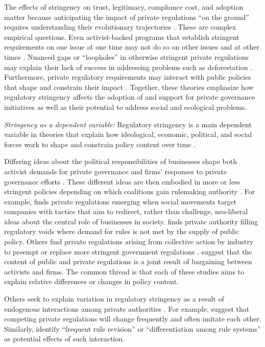 \documentclass[
      12pt,
            Review ]{article}
\begin{document}
The effects of stringency on trust, legitimacy, compliance cost, and adoption matter because anticipating the impact of private regulations ``on the ground'' requires understanding their evolutionary trajectories \citep{VanderVen2018}. These are complex empirical questions. Even activist-backed programs that establish stringent requirements on one issue at one time may not do so on other issues and at other times \citep{LeBaron2018}. Nuanced gaps or ``loopholes'' in otherwise stringent private regulations may explain their lack of success in addressing problems such as deforestation \citep{VanderVen2018}. Furthermore, private regulatory requirements may interact with public policies that shape and constrain their impact \citep{Bartley2018}. Together, these theories emphasize how regulatory stringency affects the adoption of and support for private governance initiatives as well as their potential to address social and ecological problems.

\emph{Stringency as a dependent variable:} Regulatory stringency is a main dependent variable in theories that explain how ideological, economic, political, and social forces work to shape and constrain policy content over time \citep{Bartley2003, Cashore2004, Fischer2014}.

Differing ideas about the political responsibilities of businesses shape both activist demands for private governance and firms' responses to private governance efforts \citep{Bartley2003, Djelic2017}. These different ideas are then embodied in more or less stringent policies depending on which coalitions gain rulemaking authority \citep{Botzem2012, Hsueh2012}. For example, \citet{Bartley2003} finds private regulations emerging when social movements target companies with tactics that aim to redirect, rather than challenge, neo-liberal ideas about the central role of businesses in society. \citet{Green2013} finds private authority filling regulatory voids where demand for rules is not met by the supply of public policy. Others find private regulations arising from collective action by industry to preempt or replace more stringent government regulations \citep{Bartley2007, Cashore2002, Grabosky2013, Loconto2014, Lyon2008, Maxwell2000, Prakash2000}. \citet{Abbott2009} suggest that the content of public and private regulations is a joint result of bargaining between activists and firms. The common thread is that each of these studies aims to explain relative differences or changes in policy content.

Others seek to explain variation in regulatory stringency as a result of endogenous interactions among private authorities \citep{DeLeon2009, Eberlein2014, Green2017, Gulbrandsen2014, Howard-Grenville2008, Li2015, Mills2016d}. For example, \citet{Smith2010} suggest that competing private regulations will change frequently and often imitate each other. Similarly, \citet{Eberlein2014} identify ``frequent rule revision'' or ``differentiation among rule systems'' as potential effects of such interaction.
\end{document}
